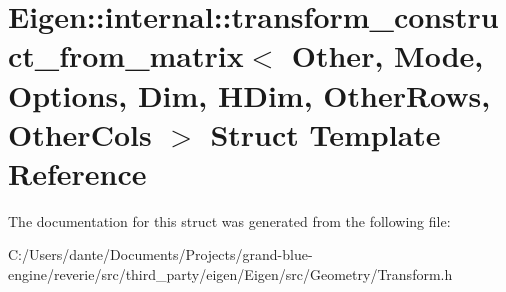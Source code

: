 \hypertarget{struct_eigen_1_1internal_1_1transform__construct__from__matrix}{}\section{Eigen\+::internal\+::transform\+\_\+construct\+\_\+from\+\_\+matrix$<$ Other, Mode, Options, Dim, H\+Dim, Other\+Rows, Other\+Cols $>$ Struct Template Reference}
\label{struct_eigen_1_1internal_1_1transform__construct__from__matrix}


The documentation for this struct was generated from the following file\+:\begin{DoxyCompactItemize}
\item 
C\+:/\+Users/dante/\+Documents/\+Projects/grand-\/blue-\/engine/reverie/src/third\+\_\+party/eigen/\+Eigen/src/\+Geometry/Transform.\+h\end{DoxyCompactItemize}
